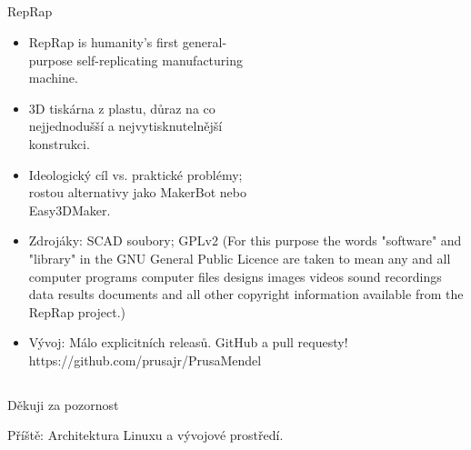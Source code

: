 \documentclass{beamer}
\begin{document}
\subsection{}
\begin{frame}{RepRap}
\begin{itemize}
\item RepRap is humanity's first general-\\purpose self-replicating manufacturing \\ machine.
\item 3D tiskárna z plastu, důraz na co \\ nejjednodušší a nejvytisknutelnější \\ konstrukci.
\item Ideologický cíl vs. praktické problémy; \\ rostou alternativy jako MakerBot nebo \\ Easy3DMaker.
\item Zdrojáky: SCAD soubory; GPLv2 {\footnotesize (For this purpose the words "software" and "library" in the GNU General Public Licence are taken to mean any and all computer programs computer files designs images videos sound recordings data results documents and all other copyright information available from the RepRap project.)}
\item Vývoj: Málo explicitních releasů. GitHub a pull requesty! https://github.com/prusajr/PrusaMendel
\end{itemize}
\end{frame}


\subsection{}
\begin{frame}{Děkuji za pozornost}
\begin{center}
Příště: Architektura Linuxu a vývojové prostředí.
\end{center}
\end{frame}
\end{document}
